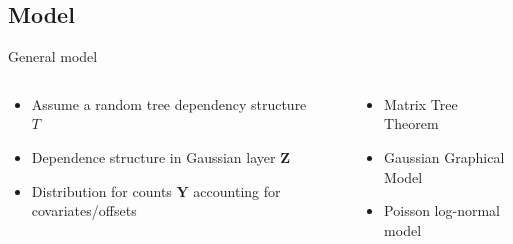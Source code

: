 \documentclass[11pt]{beamer}
\newcommand{\Ybf}{{\boldsymbol{Y}}}
\newcommand{\Zbf}{{\boldsymbol{Z}}}
\newcommand{\length}{1.5}
\newcommand{\emphase}[1]{\textcolor{Complement}{#1}}
\begin{document}
\subsection{Model}
 \begin{frame}{General model}
 \begin{columns}
 
 \begin{column}{0.45\linewidth}
  \begin{itemize}
  \item Assume a random tree dependency structure $T$\vspace{0.3cm}
  
 \item Dependence structure in  Gaussian layer $\Zbf$\vspace{0.3cm}
 
 \item Distribution for counts $\Ybf$ accounting for covariates/offsets
 \end{itemize}
 \end{column}

 \begin{column}{0.1\linewidth}
  \begin{center}
   \end{center}
  \end{column}
  
 \begin{column}{0.45\linewidth}
 \begin{itemize}
  \item Matrix Tree Theorem \vspace{0.6cm}
  \item Gaussian Graphical Model \vspace{0.6cm}
  \item Poisson log-normal model\vspace{0.6cm}
  \end{itemize}
 \end{column}
   \end{columns}

 \end{frame}
\end{document}

